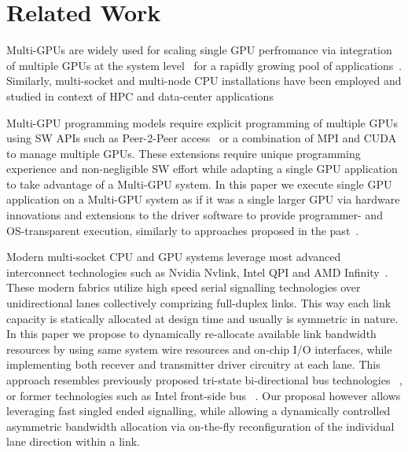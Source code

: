 \section{Related Work}
Multi-GPUs are widely used for scaling single GPU perfromance
via integration of multiple GPUs at the system
level~\cite{pascal-tesla-wp,dgx,intersect360,titan_supercomputer} for a
rapidly growing pool of applications~\cite{coral,cudnn,Lavin15b,SimonyanZ14a}.
Similarly, multi-socket and multi-node CPU
installations have been employed and studied in context of HPC and
data-center applications~\cite{Intel:Xeon,IBM:Power,IBM:z196,AMD:Opteron}

Multi-GPU programming models require explicit programming of multiple GPUs
using SW APIs such as Peer-2-Peer access~\cite{NVIDIAP2P} or a combination of
MPI and CUDA~\cite{NVIDIAMPI} to manage multiple GPUs. These extensions require
unique programming experience and non-negligible SW effort while adapting a
single GPU application to take advantage of a Multi-GPU system. In this paper
we execute single GPU application on a Multi-GPU system as if it was a single
larger GPU via hardware innovations and extensions to the driver software to
provide programmer- and OS-transparent execution, similarly to approaches
proposed in the past~\cite{Cabezas2015,lee2013transparent,ben2015memory}.

Modern multi-socket CPU and GPU systems leverage most advanced interconnect
technologies such as Nvidia Nvlink, Intel QPI and AMD
Infinity~\cite{dgx,INTELQPI,AMDINFINITYFABRIC}. These modern fabrics utilize
high speed serial signalling technologies over unidirectional lanes
collectively comprizing full-duplex links. This way each link capacity is
statically allocated at design time and usually is symmetric in nature. In this
paper we propose to dynamically re-allocate available link bandwidth resources
by using same system wire resources and on-chip I/O interfaces, while
implementing both recever and transmitter driver circuitry at each lane. This
approach resembles previously proposed tri-state bi-directional bus
technologies ~\cite{tri-state}, or former technologies such as Intel front-side
bus ~\cite{fsb}. Our proposal however allows leveraging fast
singled ended signalling, while allowing a dynamically controlled
asymmetric bandwidth allocation via on-the-fly reconfiguration of the
individual lane direction within a link.

